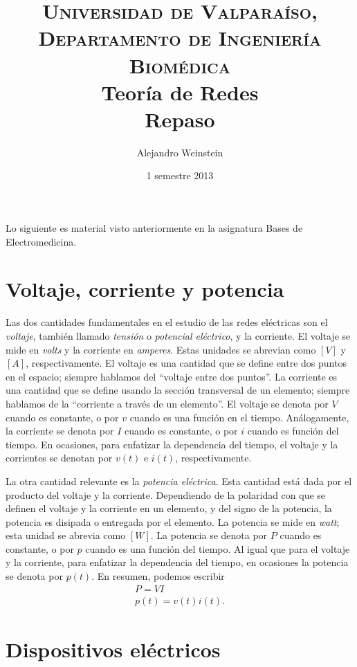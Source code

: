 \documentclass[paper=letter, fontsize=11pt]{scrartcl}
\title{
\normalfont \normalsize
\textsc{Universidad de Valparaíso, Departamento de Ingeniería Biomédica} \\
[25pt]
\huge Teoría de Redes \\ %
\LARGE Repaso
}
\author{Alejandro Weinstein}
\date{\normalsize 1\ts{er} semestre 2013} %
\begin{document}
\maketitle

Lo siguiente es material visto anteriormente en la asignatura Bases de
Electromedicina.

\section{Voltaje, corriente y potencia}

Las dos cantidades fundamentales en el estudio de las redes eléctricas son el
\emph{voltaje}, también llamado \emph{tensión} o \emph{potencial eléctrico}, y
la corriente. El voltaje se mide en \emph{volts} y la corriente en
\emph{amperes}. Estas unidades se abrevian como $[V]$ y $[A]$,
respectivamente. El voltaje es una cantidad que se define entre dos puntos en
el espacio; siempre hablamos del ``voltaje entre dos puntos''. La corriente es
una cantidad que se define usando la sección transversal de un elemento;
siempre hablamos de la ``corriente a través de un elemento''. El voltaje se
denota por $V$ cuando es constante, o por $v$ cuando es una función en el
tiempo. Análogamente, la corriente se denota por $I$ cuando es constante, o por
$i$ cuando es función del tiempo. En ocasiones, para enfatizar la dependencia
del tiempo, el voltaje y la corrientes se denotan por $v(t)$ e $i(t)$,
respectivamente.

La otra cantidad relevante es la \emph{potencia eléctrica}. Esta cantidad está
dada por el producto del voltaje y la corriente. Dependiendo de la polaridad
con que se definen el voltaje y la corriente en un elemento, y del signo de la
potencia, la potencia es disipada o entregada por el elemento. La potencia se
mide en \emph{watt}; esta unidad se abrevia como $[W]$. La potencia se denota
por $P$ cuando es constante, o por $p$ cuando es una función del tiempo. Al
igual que para el voltaje y la corriente, para enfatizar la dependencia del
tiempo, en ocasiones la potencia se denota por $p(t)$. En resumen, podemos
escribir
%
\begin{gather}
  \label{eq:pot}
  P = V I \\
  p(t) = v(t) i(t).
\end{gather}


\section{Dispositivos  eléctricos}
\end{document}
